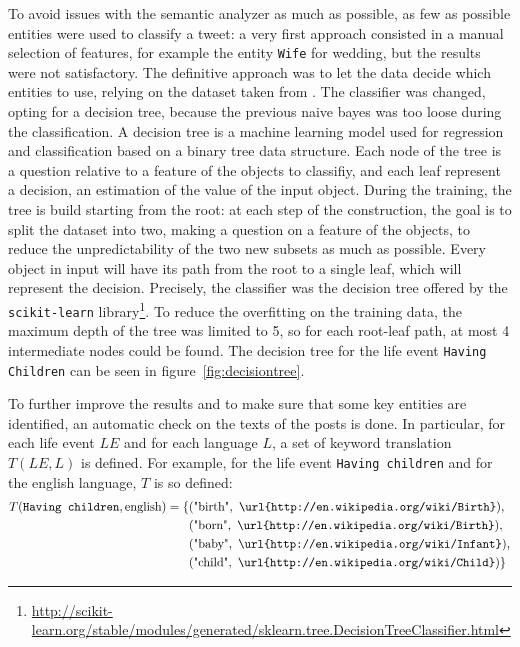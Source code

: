 To avoid issues with the semantic analyzer as much as possible, as few as possible entities were used to classify a tweet: a very first approach consisted in a manual selection of features, for example the entity \texttt{Wife} for wedding, but the results were not satisfactory. The definitive approach was to let the data decide which entities to use, relying on the dataset taken from \cite{dickinson2015identifying}. The classifier was changed, opting for a decision tree, because the previous naive bayes was too loose during the classification. A decision tree is a machine learning model used for regression and classification based on a binary tree data structure. Each node of the tree is a question relative to a feature of the objects to classifiy, and each leaf represent a decision, an estimation of the value of the input object. During the training, the tree is build starting from the root: at each step of the construction, the goal is to split the dataset into two, making a question on a feature of the objects, to reduce the unpredictability of the two new subsets as much as possible. Every object in input will have its path from the root to a single leaf, which will represent the decision. Precisely, the classifier was the decision tree offered by the \texttt{scikit-learn} library\footnote{\url{http://scikit-learn.org/stable/modules/generated/sklearn.tree.DecisionTreeClassifier.html}}. To reduce the overfitting on the training data, the maximum depth of the tree was limited to 5, so for each root-leaf path, at most 4 intermediate nodes could be found. The decision tree for the life event \texttt{Having Children} can be seen in figure~\ref{fig:decisiontree}.

To further improve the results and to make sure that some key entities are identified, an automatic check on the texts of the posts is done. In particular, for each life event $LE$ and for each language $L$, a set of keyword translation $T(LE, L)$ is defined. For example, for the life event \texttt{Having children} and for the english language, $T$ is so defined:
\begin{equation*}
\begin{split}
T(\text{\texttt{Having children}}, \text{english}) = \{&(\text{"birth"}, \text{ \texttt{\url{http://en.wikipedia.org/wiki/Birth}}}),\\&(\text{"born"}, \text{ \texttt{\url{http://en.wikipedia.org/wiki/Birth}}}),\\&(\text{"baby"}, \text{ \texttt{\url{http://en.wikipedia.org/wiki/Infant}}}),\\&(\text{"child"}, \text{ \texttt{\url{http://en.wikipedia.org/wiki/Child}}})\}
\end{split}
\end{equation*}

